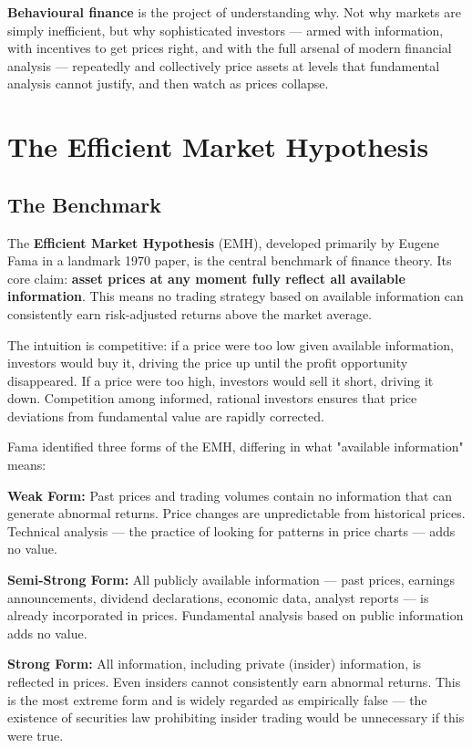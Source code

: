 \documentclass[12pt, letterpaper]{article}
\begin{document}
\textbf{Behavioural finance} is the project of understanding why. Not why markets are simply inefficient, but why sophisticated investors --- armed with information, with incentives to get prices right, and with the full arsenal of modern financial analysis --- repeatedly and collectively price assets at levels that fundamental analysis cannot justify, and then watch as prices collapse.

\medskip


\section{The Efficient Market Hypothesis}



\subsection{The Benchmark}


The \textbf{Efficient Market Hypothesis} (EMH), developed primarily by Eugene Fama in a landmark 1970 paper, is the central benchmark of finance theory. Its core claim: \textbf{asset prices at any moment fully reflect all available information}. This means no trading strategy based on available information can consistently earn risk-adjusted returns above the market average.

The intuition is competitive: if a price were too low given available information, investors would buy it, driving the price up until the profit opportunity disappeared. If a price were too high, investors would sell it short, driving it down. Competition among informed, rational investors ensures that price deviations from fundamental value are rapidly corrected.

Fama identified three forms of the EMH, differing in what "available information" means:

\textbf{Weak Form:} Past prices and trading volumes contain no information that can generate abnormal returns. Price changes are unpredictable from historical prices. Technical analysis --- the practice of looking for patterns in price charts --- adds no value.

\textbf{Semi-Strong Form:} All publicly available information --- past prices, earnings announcements, dividend declarations, economic data, analyst reports --- is already incorporated in prices. Fundamental analysis based on public information adds no value.

\textbf{Strong Form:} All information, including private (insider) information, is reflected in prices. Even insiders cannot consistently earn abnormal returns. This is the most extreme form and is widely regarded as empirically false --- the existence of securities law prohibiting insider trading would be unnecessary if this were true.
\end{document}
